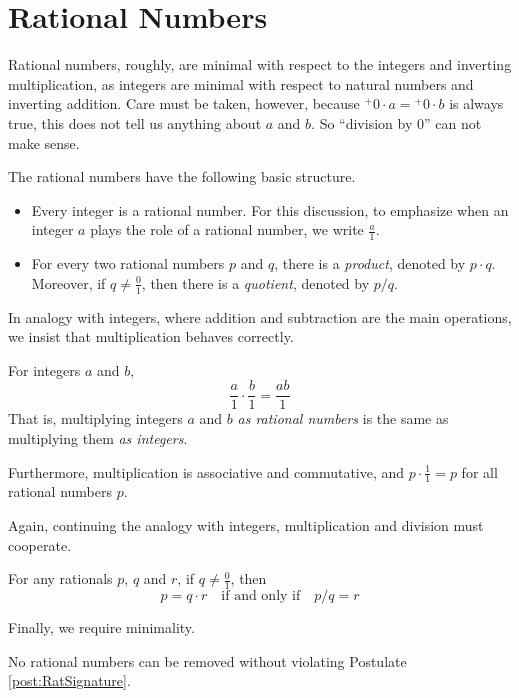 \section{Rational Numbers}

Rational numbers, roughly, are minimal with respect to the integers and inverting multiplication, as 
integers are minimal with respect to natural numbers and inverting addition. Care must be taken, however, because ${}^+0\cdot a = {}^+0\cdot b$ is always true, this does not tell us anything about $a$ and $b$. So ``division by $0$'' can not make sense.  

\begin{postulate}\label{post:RatSignature}
The rational numbers have the following basic structure.
\begin{itemize}
\item Every integer is a rational number. For this discussion, to emphasize when an integer $a$ plays the
role of a rational number, we write $\frac{a}{1}$. 
\item For every two rational numbers $p$ and $q$, there is a \emph{product}, denoted by $p\cdot q$.
Moreover, if $q\neq \frac{0}{1}$, then there is a \emph{quotient}, denoted by $p/q$.
\end{itemize}
\end{postulate}

In analogy with integers, where addition and subtraction are the main operations, we insist that
multiplication behaves correctly. 

\begin{postulate}\label{post:RatMultiplication}
For integers $a$ and $b$,
\[\frac{a}1 \cdot \frac{b}1 = \frac{ab}1\]
That is, multiplying integers $a$ and $b$ \emph{as rational numbers} is the same as multiplying them \emph{as integers}.

Furthermore, multiplication is associative and commutative, and $p \cdot \frac{1}{1} = p$ for all rational numbers $p$.
\end{postulate}

Again, continuing the analogy with integers, multiplication and division must cooperate.
\begin{postulate}\label{post:rationaldivision}
For any rationals $p$, $q$ and $r$,
if $q\neq \frac{0}1$, then 
\[p= q \cdot r\quad\text{if and only if}\quad p/q = r\]
\end{postulate}

Finally, we require minimality.

\begin{postulate}\label{post:RationalInduction}
  No rational numbers can be removed without violating Postulate \ref{post:RatSignature}.
\end{postulate}

